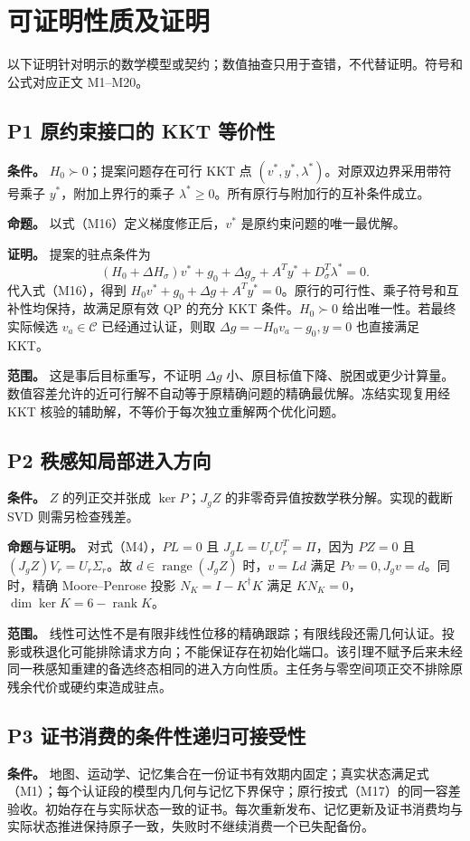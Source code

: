 \section{可证明性质及证明}
以下证明针对明示的数学模型或契约；数值抽查只用于查错，不代替证明。符号和公式对应正文 M1--M20。

\subsection{P1 原约束接口的 KKT 等价性}
\textbf{条件。} $H_0\succ0$；提案问题存在可行 KKT 点 $(v^*,y^*,\lambda^*)$。对原双边界采用带符号乘子 $y^*$，附加上界行的乘子 $\lambda^*\ge0$。所有原行与附加行的互补条件成立。

\textbf{命题。} 以式（M16）定义梯度修正后，$v^*$ 是原约束问题的唯一最优解。

\textbf{证明。} 提案的驻点条件为
\[
 (H_0+\Delta H_\sigma)v^*+g_0+\Delta g_\sigma+A^Ty^*+D_\sigma^T\lambda^*=0.
\]
代入式（M16），得到 $H_0v^*+g_0+\Delta g+A^Ty^*=0$。原行的可行性、乘子符号和互补性均保持，故满足原有效 QP 的充分 KKT 条件。$H_0\succ0$ 给出唯一性。若最终实际候选 $v_a\in\mathcal C$ 已经通过认证，则取 $\Delta g=-H_0v_a-g_0,y=0$ 也直接满足 KKT。

\textbf{范围。} 这是事后目标重写，不证明 $\Delta g$ 小、原目标值下降、脱困或更少计算量。数值容差允许的近可行解不自动等于原精确问题的精确最优解。冻结实现复用经 KKT 核验的辅助解，不等价于每次独立重解两个优化问题。

\subsection{P2 秩感知局部进入方向}
\textbf{条件。} $Z$ 的列正交并张成 $\ker P$；$J_gZ$ 的非零奇异值按数学秩分解。实现的截断 SVD 则需另检查残差。

\textbf{命题与证明。} 对式（M4），$PL=0$ 且 $J_gL=U_rU_r^T=\Pi$，因为 $PZ=0$ 且 $(J_gZ)V_r=U_r\Sigma_r$。故 $d\in\operatorname{range}(J_gZ)$ 时，$v=Ld$ 满足 $Pv=0,J_gv=d$。同时，精确 Moore--Penrose 投影 $N_K=I-K^\dagger K$ 满足 $KN_K=0$，$\dim\ker K=6-\operatorname{rank}K$。

\textbf{范围。} 线性可达性不是有限非线性位移的精确跟踪；有限线段还需几何认证。投影或秩退化可能排除请求方向；不能保证存在初始化端口。该引理不赋予后来未经同一秩感知重建的备选终态相同的进入方向性质。主任务与零空间项正交不排除原残余代价或硬约束造成驻点。

\subsection{P3 证书消费的条件性递归可接受性}
\textbf{条件。} 地图、运动学、记忆集合在一份证书有效期内固定；真实状态满足式（M1）；每个认证段的模型内几何与记忆下界保守；原行按式（M17）的同一容差验收。初始存在与实际状态一致的证书。每次重新发布、记忆更新及证书消费均与实际状态推进保持原子一致，失败时不继续消费一个已失配备份。

